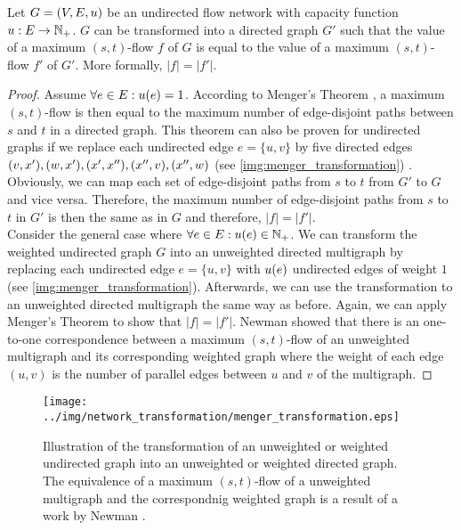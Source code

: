 \begin{lemma}
\label{lemma:undirected_transformation}
Let $G = (V,E,u)$ be an undirected flow network with capacity function $u: E \rightarrow \mathbb{N}_+$.
$G$ can be transformed into a directed graph $G'$ such that the value of a maximum $(s,t)$-flow $f$ of $G$
is equal to the value of a maximum $(s,t)$-flow $f'$ of $G'$. More formally, $|f| = |f'|$.
\end{lemma}

\begin{proof}
Assume $\forall e \in E: u(e) = 1$. According to Menger's Theorem \cite{menger1927allgemeinen},
a maximum $(s,t)$-flow is then equal to the maximum number of edge-disjoint paths between 
$s$ and $t$ in a directed graph.
This theorem can also be proven for undirected graphs if we replace each undirected edge
$e = \{u,v\}$ by five directed edges $(v,x'),(w,x'),(x',x''),(x'',v),(x'',w)$ (see \autoref{img:menger_transformation})
\cite{menger1927allgemeinen}. Obviously, we can map each set of edge-disjoint paths from $s$ to $t$ from $G'$ to $G$
and vice versa. Therefore, the maximum number of edge-disjoint paths from $s$ to $t$ in
$G'$ is then the same as in $G$ and therefore, $|f| = |f'|$. \\
Consider the general case where $\forall e \in E: u(e) \in \mathbb{N}_+$. We can transform the
weighted undirected graph $G$ into an unweighted directed multigraph by replacing each undirected
edge $e = \{u,v\}$ with $u(e)$ undirected edges of weight $1$ (see \autoref{img:menger_transformation}).
Afterwards, we can use the transformation to an unweighted directed multigraph the same way as before.
Again, we can apply Menger's Theorem to show that $|f| = |f'|$. Newman \cite{newman2004analysis}
showed that there is an one-to-one correspondence between a maximum $(s,t)$-flow of an unweighted multigraph
and its corresponding weighted graph where the weight of each edge $(u,v)$ is the number of parallel
edges between $u$ and $v$ of the multigraph.
\end{proof}

\begin{figure}[h]
\centering
\texttt{[image: ../img/network\_transformation/menger\_transformation.eps]}
\caption{Illustration of the transformation of an unweighted or weighted undirected graph into
         an unweighted or weighted directed graph. The equivalence of a maximum $(s,t)$-flow
         of a unweighted multigraph and the correspondnig weighted graph is a result of 
         a work by Newman \cite{newman2004analysis}.}
\label{img:menger_transformation}
\end{figure}

